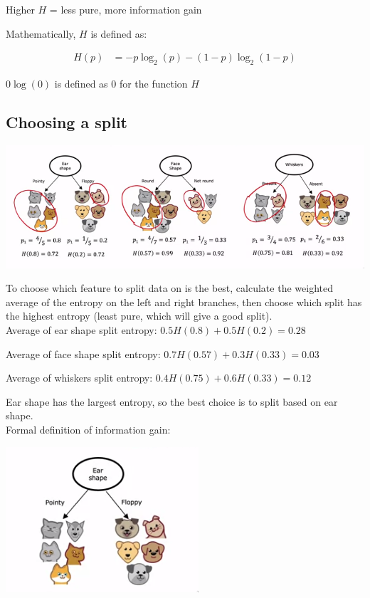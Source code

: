 \documentclass[12pt]{article}
\begin{document}
Higher $H$ = less pure, more information gain

Mathematically, $H$ is defined as:

\begin{align*}
    H(p) &= -p \log_2(p) - (1 - p) \log_2(1 - p)
\end{align*}

$0 \log(0)$ is defined as 0 for the function $H$

\subsection{Choosing a split}

\includegraphics[scale=.6]{split}

To choose which feature to split data on is the best, calculate the weighted average of the entropy on the left
and right branches, then choose which split has the highest entropy (least pure, which will give a good split).\\

Average of ear shape split entropy: $0.5 H(0.8) + 0.5 H(0.2) = 0.28$

Average of face shape split entropy: $0.7 H(0.57) + 0.3 H(0.33) = 0.03$

Average of whiskers split entropy: $0.4 H(0.75) + 0.6 H(0.33) = 0.12$

Ear shape has the largest entropy, so the best choice is to split based on ear shape.\\

Formal definition of information gain:

\includegraphics{information-gain}
\end{document}

